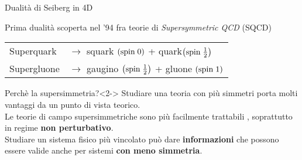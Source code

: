 \documentclass[10pt,compress,usenames,dvipsnames]{beamer}
\begin{document}
\begin{frame}{Dualità di Seiberg in 4D}

Prima dualità scoperta nel '94 fra teorie di \emph{Supersymmetric QCD} (SQCD)
\begin{table}
\begin{tabular}{l l}
Superquark \quad & $\longrightarrow$ \quad squark $\left( \hbox{spin} \;  0 \right)$ + quark$\left (\hbox{spin} \;  \frac{1}{2} \right)$ \\
Supergluone \quad &  $\longrightarrow$ \quad gaugino $\left (\hbox{spin} \;  \frac{1}{2} \right)$ + gluone  $\left( \hbox{spin} \;  1 \right)$ \\
\end{tabular}
\end{table}

\begin{block}{Perchè la supersimmetria?}<2->
Studiare una teoria con più simmetri porta molti vantaggi da un punto di vista teorico.\\
\vspace{0.1cm}
Le teorie di campo supersimmetriche sono più facilmente trattabili , soprattutto in regime \alert{\bfseries non perturbativo}.\\
\vspace{0.1cm}
Studiare un sistema fisico più vincolato può dare \alert{\bfseries informazioni} che possono essere valide anche per sistemi \alert{\bfseries con meno simmetria}.  
\end{block}


\end{frame}
\end{document}
